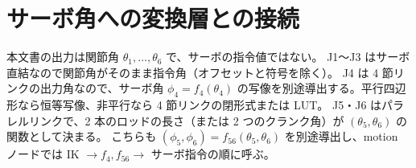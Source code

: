 \documentclass[a4paper,11pt]{ltjsarticle}
\begin{document}
\section{サーボ角への変換層との接続}
本文書の出力は関節角 $\theta_1,\dots,\theta_6$ で、サーボの指令値ではない。
J1〜J3 はサーボ直結なので関節角がそのまま指令角（オフセットと符号を除く）。
J4 は 4 節リンクの出力角なので、サーボ角 $\phi_4=f_4(\theta_4)$ の写像を別途導出する。平行四辺形なら恒等写像、非平行なら 4 節リンクの閉形式または LUT。
J5・J6 はパラレルリンクで、2 本のロッドの長さ（または 2 つのクランク角）が $(\theta_5,\theta_6)$ の関数として決まる。
こちらも $(\phi_5,\phi_6)=f_{56}(\theta_5,\theta_6)$ を別途導出し、motion ノードでは IK $\to f_4, f_{56}\to$ サーボ指令の順に呼ぶ。
\end{document}
